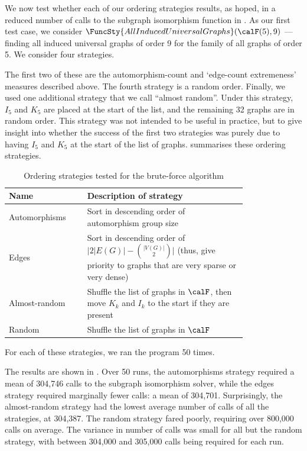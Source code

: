 We now test whether each of our ordering strategies results, as hoped,
in a reduced number of calls to the subgraph isomorphism function
in .  As our first test case, we consider 
$\FuncSty{AllInducedUniversalGraphs}(\calF(5),9)$ ---
finding all induced universal graphs of order 9 for the family of
all graphs of order 5.  We consider four strategies.

The first two of these are the automorphism-count and `edge-count extremeness'
measures described above.  The fourth strategy is a random order.
Finally, we used one additional strategy that we call ``almost random''.
Under this strategy, $I_5$ and $K_5$ are placed at the start of the list,
and the remaining 32 graphs are in random order.  This strategy was not
intended to be useful in practice, but to give insight into whether
the success of the first two strategies was purely due to having
$I_5$ and $K_5$ at the start of the list of graphs. 
summarises these ordering strategies.

\begin{table}[h!]
\centering
 \begin{tabular}{p{0.25\linewidth} p{0.55\linewidth}}
 \toprule
    Name & Description of strategy \\ [0.5ex]
 \midrule
    Automorphisms & Sort in descending order of automorphism group size \\
    Edges & Sort in descending order of $\big|{2|E(G)| - {|V(G)| \choose 2}}\big|$ 
            (thus, give priority to graphs that are very sparse or very dense)\\
    Almost-random & Shuffle the list of graphs in $\calF$, then move $K_k$ and $I_k$ to the start if they are present \\
    Random & Shuffle the list of graphs in $\calF$ \\
 \bottomrule
\end{tabular}
\caption{Ordering strategies tested for the brute-force algorithm}
\label{tab:ordering-strategies}
\end{table}

For each of these strategies, we ran the program 50 times.

The results are shown in .  Over 50 runs,
the automorphisms strategy required a mean of 304,746 calls to the subgraph
isomorphism solver, while the edges strategy required marginally fewer
calls:  a mean of 304,701.  Surprisingly, the almost-random
strategy had the lowest average number of calls of all the strategies,
at 304,387.  The random strategy fared poorly, requiring over 800,000
calls on average.
The variance in number of calls was small for all but the random strategy,
with between 304,000 and 305,000 calls being required for each run.

